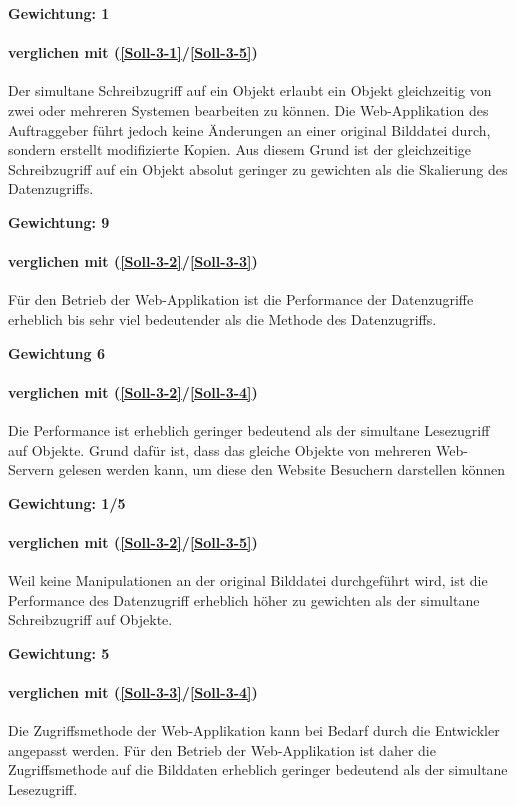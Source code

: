 \textbf{Gewichtung: 1}


\paragraph*{ verglichen mit  (\ref{Soll-3-1}/\ref{Soll-3-5})}
Der simultane Schreibzugriff auf ein Objekt erlaubt ein Objekt gleichzeitig von zwei oder mehreren Systemen bearbeiten zu können. Die Web-Applikation des Auftraggeber führt jedoch keine Änderungen an einer original Bilddatei durch, sondern erstellt modifizierte Kopien. Aus diesem Grund ist der gleichzeitige Schreibzugriff auf ein Objekt absolut geringer zu gewichten als die Skalierung des Datenzugriffs.

\textbf{Gewichtung: 9}

\paragraph*{ verglichen mit  (\ref{Soll-3-2}/\ref{Soll-3-3})}
Für den Betrieb der Web-Applikation ist die Performance der Datenzugriffe erheblich bis sehr viel bedeutender als die Methode des Datenzugriffs.

\textbf{Gewichtung 6}

\paragraph*{ verglichen mit  (\ref{Soll-3-2}/\ref{Soll-3-4})}
Die Performance ist erheblich geringer bedeutend als der simultane Lesezugriff auf Objekte. Grund dafür ist, dass das gleiche Objekte von mehreren Web-Servern gelesen werden kann, um diese den Website Besuchern darstellen können 

\textbf{Gewichtung: 1/5}

\paragraph*{ verglichen mit  (\ref{Soll-3-2}/\ref{Soll-3-5})}
Weil keine Manipulationen an der original Bilddatei durchgeführt wird, ist die Performance des Datenzugriff erheblich höher zu gewichten als der simultane Schreibzugriff auf Objekte. 

\textbf{Gewichtung: 5}


\paragraph*{ verglichen mit  (\ref{Soll-3-3}/\ref{Soll-3-4})}
Die Zugriffsmethode der Web-Applikation kann bei Bedarf durch die Entwickler angepasst werden. Für den Betrieb der Web-Applikation ist daher die Zugriffsmethode auf die Bilddaten erheblich geringer bedeutend als der simultane Lesezugriff.

